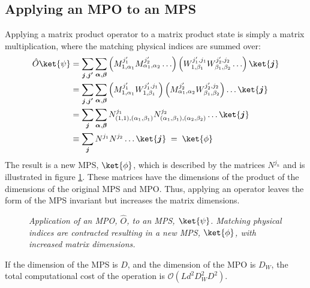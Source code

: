 \subsection{Applying an MPO to an MPS}
Applying a matrix product operator to a matrix product state is simply a matrix multiplication, where the matching physical indices are summed over:
\begin{align}
	\hat{O} \ket{\psi} &=  \sum_{\boldsymbol{j},\boldsymbol{j'}} \sum_{\boldsymbol{\alpha},\boldsymbol{\beta}} \left( M_{1, \alpha_1}^{ j_1 '} M_{\alpha_1, \alpha_2}^{j_2 '} \ldots \right) \left( W_{1, \beta_1}^{j_1 ' , j_1 } W_{\beta_1, \beta_2}^{j_2 ', j_2 } \ldots \right) \ket{\boldsymbol{j}} \nonumber \\
&= \sum_{\boldsymbol{j},\boldsymbol{j'}} \sum_{\boldsymbol{\alpha},\boldsymbol{\beta}} \left( M_{1, \alpha_1}^{ j_1 '} W_{1, \beta_1}^{j_1 ' , j_1} \right) \left( M_{\alpha_1, \alpha_2}^{j_2 '}  W_{\beta_1, \beta_2}^{j_2 ' , j_2} \right) \ldots \ket{\boldsymbol{j}} \nonumber \\
&= \sum_{\boldsymbol{j}} \sum_{\boldsymbol{\alpha},\boldsymbol{\beta}} N_{(1,1),(\alpha_1 , \beta_1)}^{j_1} N_{(\alpha_1 , \beta_1),(\alpha_2 , \beta_2)}^{j_2} \ldots \ket{\boldsymbol{j}} \nonumber \\
&\equiv \sum_{\boldsymbol{j}} N^{j_1} N^{j_2} \ldots \ket{\boldsymbol{j}} \; = \; \ket{\phi}
\label{eq:optBracketsMPO}
\end{align} 
The result is a new MPS, $\ket{\phi}$, which is described by the matrices $N^{j_n}$ and is illustrated in figure \ref{fig:MPOcont}. These matrices have the dimensions of the product of the dimensions of the original MPS and MPO. Thus, applying an operator leaves the form of the MPS invariant but increases the matrix dimensions.
\begin{figure}[h!]
	\centering
	
	\caption{\textit{Application of an MPO, $\hat{O}$, to an MPS, $\ket{\psi}$. Matching physical indices are contracted resulting in a new MPS, $\ket{\phi}$, with increased matrix dimensions.}}
	\label{fig:MPOcont}
\end{figure}
If the dimension of the MPS is $D$, and the dimension of the MPO is $D_W$, the total computational cost of the operation is $\mathcal{O}(L d^2 D_W ^2 D^2)$.\cite{schollwock, McCulloch2007}

